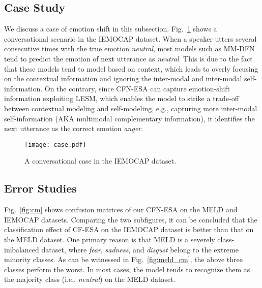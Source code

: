 \documentclass[journal]{IEEEtran}
\begin{document}
\subsection{Case Study}
We discuss a case of emotion shift in this subsection. Fig.~\ref{fig:case} shows a conversational scenario in the IEMOCAP dataset. When a speaker utters several consecutive times with the true emotion \textit{neutral}, most models such as MM-DFN tend to predict the emotion of next utterance as \textit{neutral}. This is due to the fact that these models tend to model based on context, which leads to overly focusing on the contextual information and ignoring the inter-modal and inter-modal self-information. On the contrary, since CFN-ESA can capture emotion-shift information exploiting LESM, which enables the model to strike a trade-off between contextual modeling and self-modeling, e.g., capturing more inter-modal self-information (AKA multimodal complementary information), it identifies the next utterance as the correct emotion \textit{anger}.
\begin{figure}[htbp]
    \centering
    \texttt{[image: case.pdf]}
    \caption{A conversational case in the IEMOCAP dataset.}
    \label{fig:case}
\end{figure}

\subsection{Error Studies}
Fig.~\ref{fig:cm} shows confusion matrices of our CFN-ESA on the MELD and IEMOCAP datasets. Comparing the two subfigures, it can be concluded that the classification effect of CF-ESA on the IEMOCAP dataset is better than that on the MELD dataset. One primary reason is that MELD is a severely class-imbalanced dataset, where \textit{fear}, \textit{sadness}, and \textit{disgust} belong to the extreme minority classes. As can be witnessed in Fig.~\ref{fig:meld_cm}, the above three classes perform the worst. In most cases, the model tends to recognize them as the majority class (i.e., \textit{neutral}) on the MELD dataset.
\begin{figure*}[htbp]
    \centering
    \hfil
    \caption{Confusion matrices on the MELD and IEMOCAP datasets. Note that in the confusion matrices, we convert predicted quantities into proportions.}
    \label{fig:cm}
\end{figure*}
\end{document}
